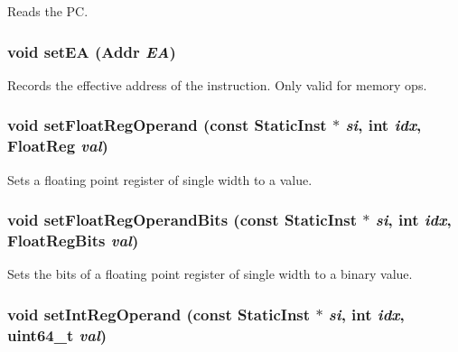 \label{classExecContext_a30cb2afdfdc1383b7804c167dcf5ee78}
Reads the PC. \hypertarget{classExecContext_a2f9742f8d2bcf6a31ebfc121fd9d5fbc}{
\subsubsection[{setEA}]{\setlength{\rightskip}{0pt plus 5cm}void setEA ({\bf Addr} {\em EA})}}
\label{classExecContext_a2f9742f8d2bcf6a31ebfc121fd9d5fbc}
Records the effective address of the instruction. Only valid for memory ops. \hypertarget{classExecContext_addc8b4b6511725bf8ff48bd09ef22892}{
\subsubsection[{setFloatRegOperand}]{\setlength{\rightskip}{0pt plus 5cm}void setFloatRegOperand (const {\bf StaticInst} $\ast$ {\em si}, \/  int {\em idx}, \/  FloatReg {\em val})}}
\label{classExecContext_addc8b4b6511725bf8ff48bd09ef22892}
Sets a floating point register of single width to a value. \hypertarget{classExecContext_a80a516966713c873cf964af7538dbd37}{
\subsubsection[{setFloatRegOperandBits}]{\setlength{\rightskip}{0pt plus 5cm}void setFloatRegOperandBits (const {\bf StaticInst} $\ast$ {\em si}, \/  int {\em idx}, \/  FloatRegBits {\em val})}}
\label{classExecContext_a80a516966713c873cf964af7538dbd37}
Sets the bits of a floating point register of single width to a binary value. \hypertarget{classExecContext_a654e99f2be7cd298378462ce9651bb44}{
\subsubsection[{setIntRegOperand}]{\setlength{\rightskip}{0pt plus 5cm}void setIntRegOperand (const {\bf StaticInst} $\ast$ {\em si}, \/  int {\em idx}, \/  uint64\_\-t {\em val})}}
